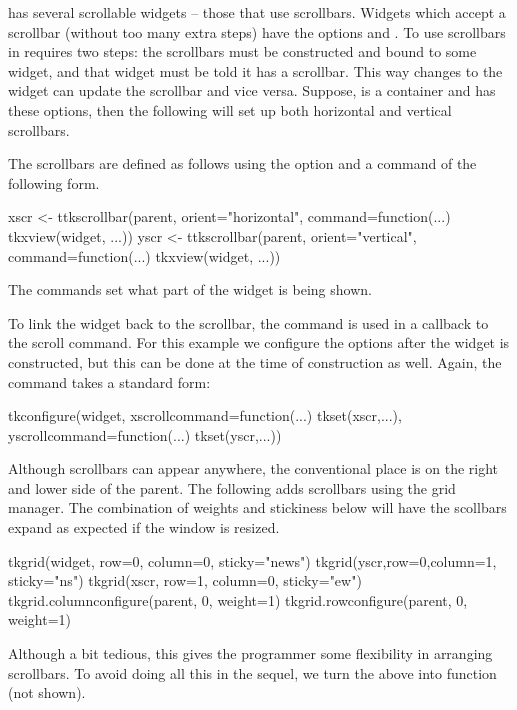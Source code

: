 \TK\/ has several scrollable widgets -- those that use scrollbars.
Widgets which accept a scrollbar (without too many extra steps) have
the options  and .  To use
scrollbars in  requires two steps: the scrollbars must be
constructed and bound to some widget, and that widget must be told it
has a scrollbar. This way changes to the widget can update the
scrollbar and vice versa. Suppose,  is a container and
 has these options, then the following will set up both
horizontal and vertical scrollbars.

The scrollbars are defined as follows using the
 option and a command of the following
form.
\begin{Schunk}
\begin{Sinput}
 xscr <- ttkscrollbar(parent, orient="horizontal",
                      command=function(...) tkxview(widget, ...))
 yscr <- ttkscrollbar(parent, orient="vertical",
                      command=function(...) tkxview(widget, ...))
\end{Sinput}
\end{Schunk}
The  commands set what part of the widget is being shown.

To link the widget back to the scrollbar, the  command is
used in a callback to the scroll command.  For this example we
configure the options after the widget is constructed, but this can be
done at the time of construction as well. Again, the command takes a
standard form:
\begin{Schunk}
\begin{Sinput}
 tkconfigure(widget,
             xscrollcommand=function(...) tkset(xscr,...),
             yscrollcommand=function(...) tkset(yscr,...))
\end{Sinput}
\end{Schunk}

Although scrollbars can appear anywhere, the conventional place is on the right and lower side of the parent. The following adds scrollbars using the grid manager. The combination of weights and stickiness below will have the scollbars expand as expected if the window is resized. 
\begin{Schunk}
\begin{Sinput}
 tkgrid(widget, row=0, column=0, sticky="news")
 tkgrid(yscr,row=0,column=1, sticky="ns")
 tkgrid(xscr, row=1, column=0, sticky="ew")
 tkgrid.columnconfigure(parent, 0, weight=1)
 tkgrid.rowconfigure(parent, 0, weight=1)
\end{Sinput}
\end{Schunk}
Although a bit tedious, this gives the programmer some flexibility in arranging scrollbars. To avoid doing all this in the sequel, we turn the above into function  (not shown).



